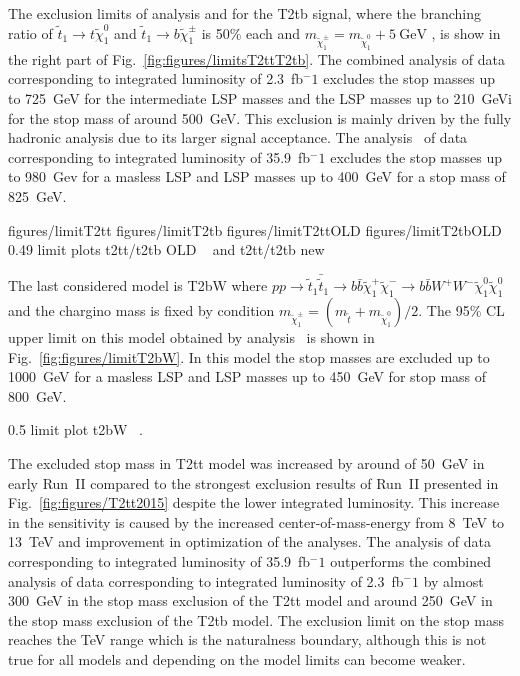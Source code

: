 The exclusion limits of analysis \cite{Sirunyan:2016jpr} and  \cite{Sirunyan:2017xse} for the T2tb signal, where the branching ratio of $ \tilde{t}_{1} \to t  \tilde{\chi}^{0}_{1} $ and $ \tilde{t}_{1} \to b  \tilde{\chi}^{\pm}_{1} $  is 50\% each and $m_{\tilde{\chi}_{1}^{\pm}} = m_{\tilde{\chi}_{1}^{0}} + 5~\mathrm{GeV}$ , is show in the right part of Fig.~\ref{fig:figures/limitsT2ttT2tb}. The combined analysis of data corresponding to integrated luminosity of 2.3~fb$^-1$ excludes the stop masses up to 725~GeV for the intermediate LSP masses and the LSP masses up to 210~GeVi for the stop mass of around 500~GeV. This exclusion is mainly driven by the fully hadronic analysis due to its larger signal acceptance. The analysis~\cite{Sirunyan:2017xse} of data corresponding to integrated luminosity of 35.9~fb$^-1$ excludes the stop masses up to 980~Gev for a masless LSP and LSP masses up to 400~GeV for a stop mass of 825~GeV. 

                 {figures/limitT2tt} %
                 {figures/limitT2tb} %
                 {figures/limitT2ttOLD} %
                 {figures/limitT2tbOLD} %
                 {0.49}       %
                 { limit plots t2tt/t2tb OLD ~\cite{Sirunyan:2016jpr} and t2tt/t2tb new  ~\cite{Sirunyan:2017xse}}

The last considered model is T2bW where $ pp \to \tilde{t}_{1} \bar{\tilde{t}}_{1} \to b \bar{b} \tilde{\chi}^{+}_{1} \tilde{\chi}^{-}_{1} \to b \bar{b} W^{+} W^{-} \tilde{\chi}^{0}_{1} \tilde{\chi}^{0}_{1}$ and the chargino mass is fixed by condition $m_{\tilde{\chi}_{1}^{\pm}} = ( m_{\tilde{t}} +  m_{\tilde{\chi}_{1}^{0}} )/2$. The 95\% CL upper limit on this model obtained by analysis~\cite{Sirunyan:2017xse} is shown  in Fig.~\ref{fig:figures/limitT2bW}. In this model the stop masses are excluded up to 1000~GeV for a masless LSP and LSP masses up to 450~GeV for stop mass of 800~GeV.

                 {0.5}       %
                 { limit plot t2bW ~\cite{Sirunyan:2017xse}. }

The excluded stop mass in T2tt model was increased by around of 50~GeV in early Run~II compared to the strongest exclusion results of Run~II presented in Fig.~\ref{fig:figures/T2tt2015} despite the lower integrated luminosity. This increase in the sensitivity is caused by the increased center-of-mass-energy from 8~TeV to 13~TeV and improvement in optimization of the analyses. The analysis of data corresponding to integrated luminosity of 35.9~fb$^-1$ outperforms the  combined analysis of data corresponding to integrated luminosity of 2.3~fb$^-1$ by almost 300~GeV in the stop mass exclusion of the T2tt model and around 250~GeV in the stop mass exclusion of the T2tb model. The exclusion limit on the stop mass reaches the TeV range which is the naturalness boundary, although this is not true for all models and depending on the model limits can become weaker.

